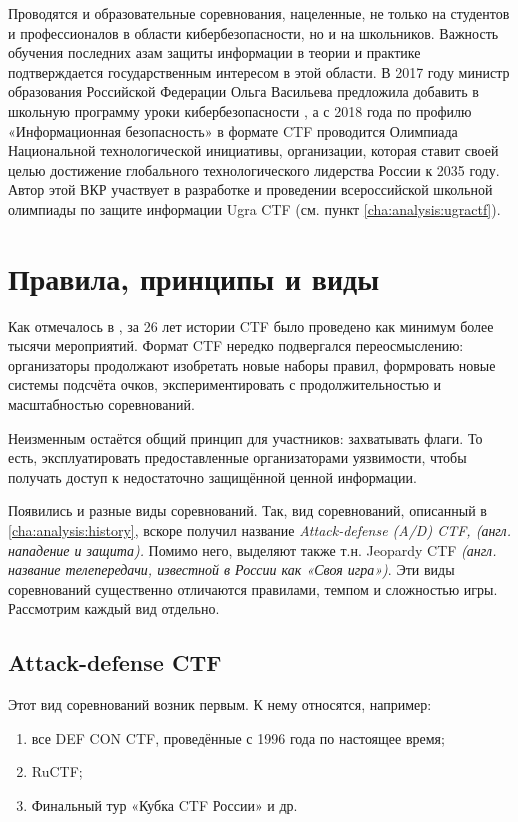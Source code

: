 Проводятся и образовательные соревнования, нацеленные, не только на студентов и профессионалов в области кибербезопасности, но и на школьников. Важность обучения последних азам защиты информации в теории и практике подтверждается государственным интересом в этой области. В 2017 году министр образования Российской Федерации Ольга Васильева предложила добавить в школьную программу уроки кибербезопасности \cite{RG17}, а с 2018 года по профилю «Информационная безопасность» в формате CTF проводится Олимпиада Национальной технологической инициативы, организации, которая ставит своей целью достижение глобального технологического лидерства России к 2035 году. Автор этой ВКР участвует в разработке и проведении всероссийской школьной олимпиады по защите информации Ugra CTF (см. пункт \ref{cha:analysis:ugractf}).



\section{Правила, принципы и виды}
\label{cha:analysis:rules}

Как отмечалось в \cite{CTFTimeTotal}, за 26 лет истории CTF было проведено как минимум более тысячи мероприятий. Формат CTF нередко подвергался переосмыслению: организаторы продолжают изобретать новые наборы правил, формровать новые системы подсчёта очков, экспериментировать с продолжительностью и масштабностью соревнований.

Неизменным остаётся общий принцип для участников: захватывать флаги. То есть, эксплуатировать предоставленные организаторами уязвимости, чтобы получать доступ к недостаточно защищённой ценной информации.

Появились и разные виды соревнований. Так, вид соревнований, описанный в \ref{cha:analysis:history}, вскоре получил название \textit{Attack-defense (A/D) CTF, (англ. нападение и защита).} Помимо него, выделяют также т.н. Jeopardy CTF \textit{(англ. название телепередачи, известной в России как «Своя игра»)}. Эти виды соревнований существенно отличаются правилами, темпом и сложностью игры. Рассмотрим каждый вид отдельно.


\subsection{Attack-defense CTF}

Этот вид соревнований возник первым. К нему относятся, например:
\begin{enumerate}
\item все DEF CON CTF, проведённые с 1996 года по настоящее время;
\item RuCTF;
\item Финальный тур «Кубка CTF России» и др.
\end{enumerate}

